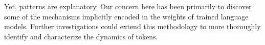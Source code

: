 \documentclass{article} %
\begin{document}
Yet, patterns are explanatory. 
Our concern here has been primarily to discover some of the mechanisms implicitly encoded in the weights of trained language models.
Further investigations could extend this methodology to more thoroughly identify and characterize the dynamics of tokens.











\end{document}
